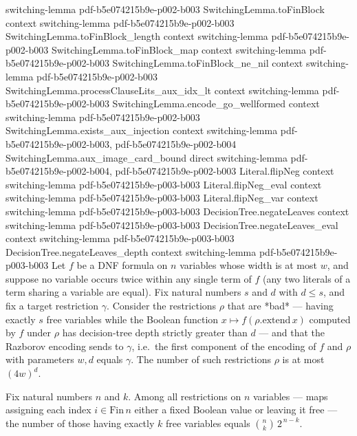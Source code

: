 \begin{lemma}
  {switching-lemma}
  {pdf-b5e074215b9e-p002-b003}
\proofstep
  {SwitchingLemma.toFinBlock}
  {context}
  {switching-lemma}
  {pdf-b5e074215b9e-p002-b003}
\proofstep
  {SwitchingLemma.toFinBlock_length}
  {context}
  {switching-lemma}
  {pdf-b5e074215b9e-p002-b003}
\proofstep
  {SwitchingLemma.toFinBlock_map}
  {context}
  {switching-lemma}
  {pdf-b5e074215b9e-p002-b003}
\proofstep
  {SwitchingLemma.toFinBlock_ne_nil}
  {context}
  {switching-lemma}
  {pdf-b5e074215b9e-p002-b003}
\proofstep
  {SwitchingLemma.processClauseLits_aux_idx_lt}
  {context}
  {switching-lemma}
  {pdf-b5e074215b9e-p002-b003}
\proofstep
  {SwitchingLemma.encode_go_wellformed}
  {context}
  {switching-lemma}
  {pdf-b5e074215b9e-p002-b003}
\proofstep
  {SwitchingLemma.exists_aux_injection}
  {context}
  {switching-lemma}
  {pdf-b5e074215b9e-p002-b003,
    pdf-b5e074215b9e-p002-b004}
\proofstep
  {SwitchingLemma.aux_image_card_bound}
  {direct}
  {switching-lemma}
  {pdf-b5e074215b9e-p002-b004,
    pdf-b5e074215b9e-p002-b003}
\proofstep
  {Literal.flipNeg}
  {context}
  {switching-lemma}
  {pdf-b5e074215b9e-p003-b003}
\proofstep
  {Literal.flipNeg_eval}
  {context}
  {switching-lemma}
  {pdf-b5e074215b9e-p003-b003}
\proofstep
  {Literal.flipNeg_var}
  {context}
  {switching-lemma}
  {pdf-b5e074215b9e-p003-b003}
\proofstep
  {DecisionTree.negateLeaves}
  {context}
  {switching-lemma}
  {pdf-b5e074215b9e-p003-b003}
\proofstep
  {DecisionTree.negateLeaves_eval}
  {context}
  {switching-lemma}
  {pdf-b5e074215b9e-p003-b003}
\proofstep
  {DecisionTree.negateLeaves_depth}
  {context}
  {switching-lemma}
  {pdf-b5e074215b9e-p003-b003}
Let $f$ be a DNF formula on $n$ variables whose width is at most $w$, and suppose no
variable occurs twice within any single term of $f$ (any two literals of a term sharing
a variable are equal). Fix natural numbers $s$ and $d$ with $d \le s$, and fix a target
restriction $\gamma$. Consider the restrictions $\rho$ that are *bad* — having exactly
$s$ free variables while the Boolean function $x \mapsto f(\rho.\mathrm{extend}\,x)$
computed by $f$ under $\rho$ has decision-tree depth strictly greater than $d$ — and
that the Razborov encoding sends to $\gamma$, i.e.\ the first component of the encoding
of $f$ and $\rho$ with parameters $w, d$ equals $\gamma$. The number of such
restrictions $\rho$ is at most $(4w)^d$.
\end{lemma}

\begin{lemma}
\label{SwitchingLemma.card_filter_numFree_eq}
\leanok
{}
Fix natural numbers $n$ and $k$. Among all restrictions on $n$ variables — maps
assigning each index $i \in \mathrm{Fin}\,n$ either a fixed Boolean value or leaving it
free — the number of those having exactly $k$ free variables equals
$\binom{n}{k}\,2^{\,n-k}$.
\end{lemma}

